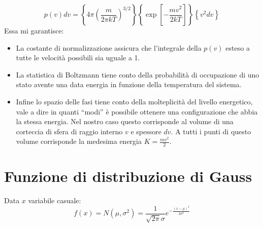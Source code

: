 \documentclass{article}
\begin{document}
\begin{itemize}
    
    \[
    p(v) dv = \left\{ 4\pi \left( \frac{m}{2\pi kT} \right)^{3/2} \right\} \left\{ \exp \left[ -\frac{mv^2}{2kT} \right] \right\} \left\{ v^2 dv \right\}
    \]
Essa mi garantisce:
\begin{itemize}
    \item La costante di normalizzazione assicura che l'integrale della \( p(v) \) esteso a tutte le velocità possibili sia uguale a 1.
    
    \item La statistica di Boltzmann tiene conto della probabilità di occupazione di uno stato avente una data energia in funzione della temperatura del sistema.
    
    \item Infine lo spazio delle fasi tiene conto della molteplicità del livello energetico, vale a dire in quanti ``modi'' è possibile ottenere una configurazione che abbia la stessa energia. Nel nostro caso questo corrisponde al volume di una corteccia di sfera di raggio interno \( v \) e spessore \( dv \). A tutti i punti di questo volume corrisponde la medesima energia \( K = \frac{mv^2}{2} \).
\end{itemize}


\end{itemize}


\section{Funzione di distribuzione di Gauss}
Data $x$ variabile casuale:
\[
f(x)=N(\mu,\sigma^2)=\frac{1}{\sqrt{2\pi}\sigma}e^{-\frac{(x-\mu)^2}{2\sigma^2}}
\]
    
\end{document}
